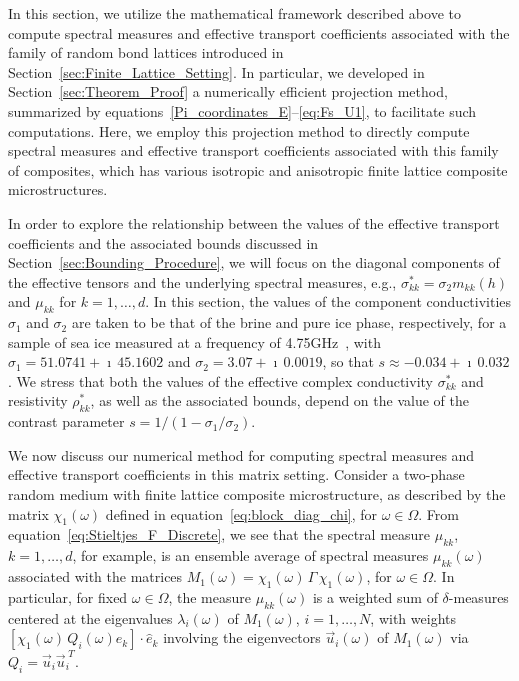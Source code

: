 \documentclass{cmslatex}
\begin{document}
In this section, we utilize the mathematical framework described above
to compute spectral measures and effective transport coefficients
associated with the family of random bond lattices introduced in
Section~\ref{sec:Finite_Lattice_Setting}. In particular, 
we developed in Section~\ref{sec:Theorem_Proof} a numerically
efficient projection method, summarized by
equations~\eqref{Pi_coordinates_E}--\eqref{eq:Fs_U1}, to facilitate
such computations. Here, we employ this projection method to directly
compute spectral measures and effective transport coefficients
associated with this family of composites, which has various isotropic
and anisotropic finite lattice composite microstructures.





In order to explore the relationship between the values of the
effective transport coefficients and the associated bounds discussed
in Section~\ref{sec:Bounding_Procedure}, we will focus on the diagonal
components of the effective tensors and the underlying spectral
measures, e.g., $\sigma^*_{kk}=\sigma_2m_{kk}(h)$ and $\mu_{kk}$ for $k=1,\ldots,d$. In
this section, the values of the component conductivities $\sigma_1$ and
$\sigma_2$ are taken to be that of the brine and pure ice phase,
respectively, for a sample of sea ice measured at a frequency of
4.75GHz~\cite{Backstrom:2007:Book}, with $\sigma_1=51.0741+\imath\,45.1602$ and
$\sigma_2=3.07+\imath\,0.0019$, so that $s\approx-0.034+\imath\,0.032$. We stress that both
the values of the effective complex conductivity $\sigma^*_{kk}$ and
resistivity $\rho^*_{kk}$, as well as the associated bounds, depend on the
value of the contrast parameter $s=1/(1-\sigma_1/\sigma_2)$. 



We now discuss our numerical method for computing spectral
measures and effective transport coefficients in this matrix setting. 
Consider a two-phase random medium with finite lattice composite
microstructure, as described by the matrix $\chi_1(\omega)$ defined in
equation~\eqref{eq:block_diag_chi}, for $\omega\in\Omega$. From
equation~\eqref{eq:Stieltjes_F_Discrete}, we see that the spectral
measure $\mu_{kk}$, $k=1,\ldots,d$, for example, is an ensemble average of
spectral measures $\mu_{kk}(\omega)$ associated with the matrices
$M_1(\omega)=\chi_1(\omega)\,\Gamma\,\chi_1(\omega)$, for $\omega\in\Omega$. In particular, for fixed $\omega\in\Omega$,
the measure  $\mu_{kk}(\omega)$ is a weighted sum of $\delta$-measures centered at
the eigenvalues $\lambda_i(\omega)$ of $M_1(\omega)$, $i=1,\ldots,N$, with weights
$[\chi_1(\omega)\,Q_i(\omega)\hat{e}_k]\cdot\hat{e}_k$ involving the eigenvectors 
$\vec{u}_i(\omega)$ of $M_1(\omega)$ via $Q_i=\vec{u}_i\vec{u}_i^{\;T}$.
\end{document}
